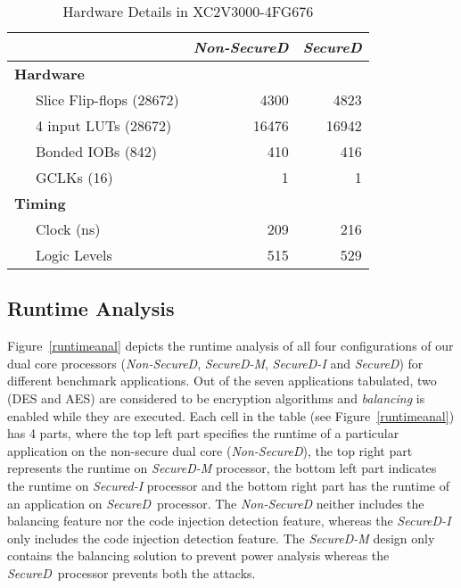\documentclass{article}
\newcommand{\SecureD}{\emph{SecureD}}
\begin{document}
\begin{table}[ht!]
\centering
\caption{Hardware Details in XC2V3000-4FG676} \label{hwsumFPGA}
\begin{tabular}[t]{|l|r|r|}\hline
                          &{\bf \emph{Non-SecureD}}&{\bf \SecureD}\\ \hline\hline
         {\bf Hardware}   &                        &        \\ 
~~~Slice Flip-flops (28672)& 4300                  &   4823 \\ 
~~~4 input LUTs (28672)   & 16476                  &  16942 \\ 
~~~Bonded IOBs (842)      &   410                  &    416 \\ 
~~~GCLKs (16)             &     1                  &      1 \\ \hline
           {\bf Timing}   &                        &        \\
~~~Clock (ns)             &   209                  &    216 \\
~~~Logic Levels           &   515                  &    529 \\ \hline\hline
\end{tabular}
\end{table}

\subsection{Runtime Analysis} \label{runtime}
Figure~\ref{runtimeanal}   depicts   the runtime analysis of all four
configurations of our dual  core      processors (\emph{Non-SecureD},
\emph{SecureD\nobreakdash-M}, \emph{SecureD\nobreakdash-I} and \SecureD)     for   different
benchmark applications. Out of the seven applications tabulated,  two
(DES and AES) are  considered to be encryption algorithms and 
\emph{balancing} is enabled while they are executed. Each cell in the
table (see Figure~\ref{runtimeanal}) has 4 parts, where  the top left part
specifies the runtime of a particular  application  on the non-secure
dual core (\emph{Non-SecureD}), the top right part represents  the runtime
on \emph{SecureD\nobreakdash-M} processor, the bottom left     part indicates the
runtime on \emph{Secured\nobreakdash-I} processor and  the bottom right part  has
the runtime of an application on \SecureD\  processor. The \emph{Non-SecureD} 
neither includes the balancing feature nor the code injection detection feature,
whereas the \emph{SecureD\nobreakdash-I} only includes the code injection detection feature.
The \emph{SecureD\nobreakdash-M} design only contains the balancing solution to prevent power analysis
whereas the \SecureD\ processor prevents both the attacks. 
\end{document}
